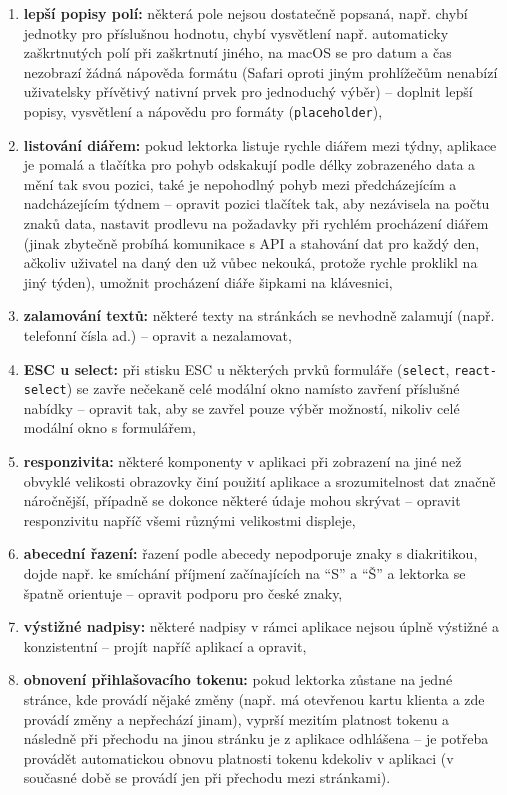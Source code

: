 \begin{enumerate}[label=\textbf{P\arabic*}]
    \item \label{P12} \textbf{lepší popisy polí:} některá pole nejsou dostatečně popsaná, např. chybí jednotky pro příslušnou hodnotu, chybí vysvětlení např. automaticky zaškrtnutých polí při zaškrtnutí jiného, na macOS se pro datum a čas nezobrazí žádná nápověda formátu (Safari oproti jiným prohlížečům nenabízí uživatelsky přívětivý nativní prvek pro jednoduchý výběr) -- doplnit lepší popisy, vysvětlení a nápovědu pro formáty (\verb|placeholder|),
    \item \label{P13} \textbf{listování diářem:} pokud lektorka listuje rychle diářem mezi týdny, aplikace je pomalá a tlačítka pro pohyb odskakují podle délky zobrazeného data a mění tak svou pozici, také je nepohodlný pohyb mezi předcházejícím a nadcházejícím týdnem -- opravit pozici tlačítek tak, aby nezávisela na počtu znaků data, nastavit prodlevu na požadavky při rychlém procházení diářem (jinak zbytečně probíhá komunikace s API a stahování dat pro každý den, ačkoliv uživatel na daný den už vůbec nekouká, protože rychle proklikl na jiný týden), umožnit procházení diáře šipkami na klávesnici,
    \item \label{P14} \textbf{zalamování textů:} některé texty na stránkách se nevhodně zalamují (např. telefonní čísla ad.) -- opravit a nezalamovat,
    \item \label{P15} \textbf{ESC u select:} při stisku ESC u některých prvků formuláře (\verb|select|, \verb|react-select|) se zavře nečekaně celé modální okno namísto zavření příslušné nabídky -- opravit tak, aby se zavřel pouze výběr možností, nikoliv celé modální okno s formulářem,
    \item \label{P16} \textbf{responzivita:} některé komponenty v aplikaci při zobrazení na jiné než obvyklé velikosti obrazovky činí použití aplikace a srozumitelnost dat značně náročnější, případně se dokonce některé údaje mohou skrývat -- opravit responzivitu napříč všemi různými velikostmi displeje,
    \item \label{P17} \textbf{abecední řazení:} řazení podle abecedy nepodporuje znaky s diakritikou, dojde např. ke smíchání příjmení začínajících na \enquote{S} a \enquote{Š} a lektorka se špatně orientuje -- opravit podporu pro české znaky,
    \item \label{P18} \textbf{výstižné nadpisy:} některé nadpisy v rámci aplikace nejsou úplně výstižné a konzistentní -- projít napříč aplikací a opravit,
    \item \label{P19} \textbf{obnovení přihlašovacího tokenu:} pokud lektorka zůstane na jedné stránce, kde provádí nějaké změny (např. má otevřenou kartu klienta a zde provádí změny a nepřechází jinam), vyprší mezitím platnost tokenu a následně při přechodu na jinou stránku je z aplikace odhlášena -- je potřeba provádět automatickou obnovu platnosti tokenu kdekoliv v aplikaci (v současné době se provádí jen při přechodu mezi stránkami).
\end{enumerate}

